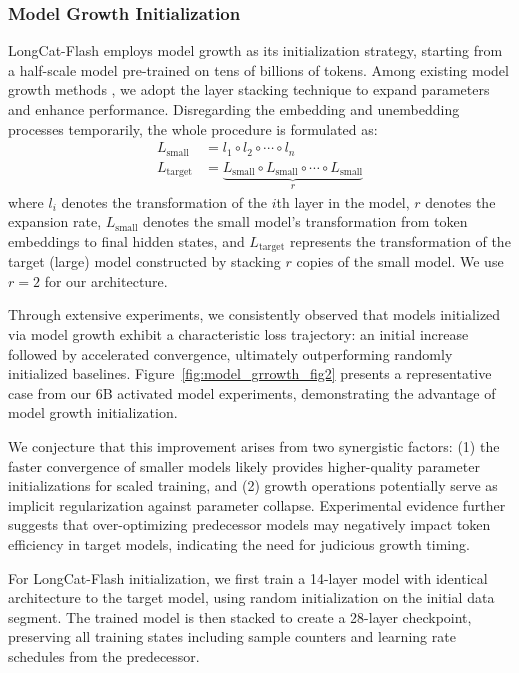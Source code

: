 \documentclass{article}
\newcommand{\longcat}{LongCat-Flash\xspace}
\begin{document}
\subsubsection{Model Growth Initialization}

\longcat employs model growth as its initialization strategy, starting from a half-scale model pre-trained on tens of billions of tokens. Among existing model growth methods \citep{chen2015net2net,du2024stacking, wang2023learning, shen2022staged, wang2023lemon, pmlr-v97-gong19a,li-etal-2020-shallow}, we adopt the layer stacking technique \citep{du2024stacking,kim2023solar,li-etal-2020-shallow} to expand parameters and enhance performance. Disregarding the embedding and unembedding processes temporarily, the whole procedure is formulated as:
\begin{align*}
    L_{\text{small}} &= l_1 \circ l_2 \circ \cdots \circ l_n \\
    L_{\text{target}} &= \underbrace{L_{\text{small}} \circ L_{\text{small}} \circ \cdots \circ L_{\text{small}}}_{r}
\end{align*}
where $l_i$ denotes the transformation of the $i$th layer in the model, $r$ denotes the expansion rate, $L_{\text{small}}$ denotes the small model's transformation from token embeddings to final hidden states, and $L_{\text{target}}$ represents the transformation of the target (large) model constructed by stacking $r$ copies of the small model. We use $r=2$ for our architecture.

Through extensive experiments, we consistently observed that models initialized via model growth exhibit a characteristic loss trajectory: an initial increase followed by accelerated convergence, ultimately outperforming randomly initialized baselines. Figure~\ref{fig:model_grrowth_fig2} presents a representative case from our 6B activated model experiments, demonstrating the advantage of model growth initialization.

We conjecture that this improvement arises from two synergistic factors: (1) the faster convergence of smaller models likely provides higher-quality parameter initializations for scaled training, and (2) growth operations potentially serve as implicit regularization against parameter collapse. Experimental evidence further suggests that over-optimizing predecessor models may negatively impact token efficiency in target models, indicating the need for judicious growth timing.

For \longcat initialization, we first train a 14-layer model with identical architecture to the target model, using random initialization on the initial data segment. The trained model is then stacked to create a 28-layer checkpoint, preserving all training states including sample counters and learning rate schedules from the predecessor.
\end{document}
